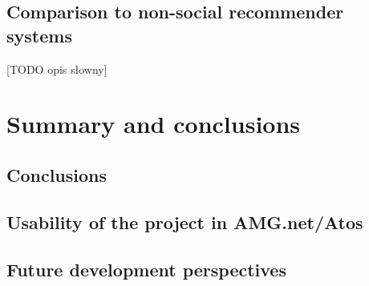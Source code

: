 \documentclass[12pt]{report}
\begin{document}
\section{Comparison to non-social recommender systems}

[TODO opis słowny]

\chapter{Summary and conclusions}
\label{ch.summary}
\section{Conclusions}
\section{Usability of the project in AMG.net/Atos}
\section{Future development perspectives}









\end{document}
